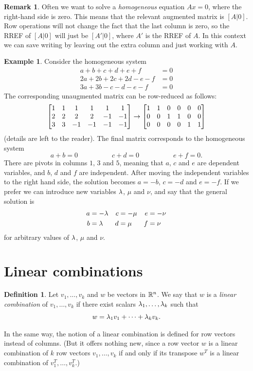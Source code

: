 \documentclass[reqno]{amsart}
\theoremstyle{definition}
\newtheorem{remark}[theorem]{Remark}
\newtheorem{definition}[theorem]{Definition}
\newtheorem{example}[theorem]{Example}
\newcommand{\dfn}[1]{\emph{{#1}}\index{#1}}
\begin{document}
\begin{remark}
 Often we want to solve a \dfn{homogeneous} equation $Ax=0$, where
 the right-hand side is zero.  This means that the relevant augmented
 matrix is $[A|0]$.  Row operations will not change the fact that the last
 column is zero, so the RREF of $[A|0]$ will just be $[A'|0]$, where
 $A'$ is the RREF of $A$.  In this context we can save writing by
 leaving out the extra column and just working with $A$.
\end{remark}
\begin{example}\label{eg-homogeneous}
 Consider the homogeneous system
 \begin{align*}
  a+b+c+d+e+f &= 0 \\
  2a+2b+2c+2d-e-f &= 0 \\
  3a+3b-c-d-e-f &= 0
 \end{align*}
 The corresponding unaugmented matrix can be row-reduced as follows:
 \[
  \left[\begin{matrix}
    1 &  1 &  1 &  1 &  1 &  1 \\
    2 &  2 &  2 &  2 & -1 & -1 \\
    3 &  3 & -1 & -1 & -1 & -1
  \end{matrix}\right] \to \left[\begin{matrix}
    1 &  1 &  0 &  0 &  0 &  0 \\
    0 &  0 &  1 &  1 &  0 &  0 \\
    0 &  0 &  0 &  0 &  1 &  1 
  \end{matrix}\right]
 \]
 (details are left to the reader).  The final matrix corresponds to
 the homogeneous system
 \[ a+b = 0 \hspace{5em} c+d=0 \hspace{5em} e+f=0. \]
 There are pivots in columns $1$, $3$ and $5$, meaning that $a$, $c$
 and $e$ are dependent variables, and $b$, $d$ and $f$ are
 independent.  After moving the independent variables to the right
 hand side, the solution becomes $a=-b$, $c=-d$ and $e=-f$.  If we
 prefer we can introduce new variables $\lambda$, $\mu$ and $\nu$, and say
 that the general solution is
 \begin{align*}
  a &= -\lambda & c &= -\mu & e &= -\nu \\
  b &=  \lambda & d &=  \mu & f &=  \nu
 \end{align*}
 for arbitrary values of $\lambda$, $\mu$ and $\nu$.
\end{example}

\section{Linear combinations}
\label{sec-lin-comb}

\begin{definition}\label{defn-lincomb}
 Let $v_1,\dotsc,v_k$ and $w$ be vectors in ${\mathbb{R}}^n$.  We say that $w$
 is a \dfn{linear combination} of $v_1,\dotsc,v_k$ if there exist
 scalars $\lambda_1,\dots,\lambda_k$ such that
 \[ w = \lambda_1v_1 + \dotsb + \lambda_kv_k. \]
 
 In the same way, the notion of a linear combination is defined
 for row vectors instead of columns.
 (But it offers nothing new, since a row vector $w$ is a
 linear combination of $k$ row vectors $v_1,\dotsc,v_k$
 if and only if its transpose $w^T$ is a linear combination
 of $v_1^T,\dotsc,v_k^T$.)
\end{definition}
\end{document}
